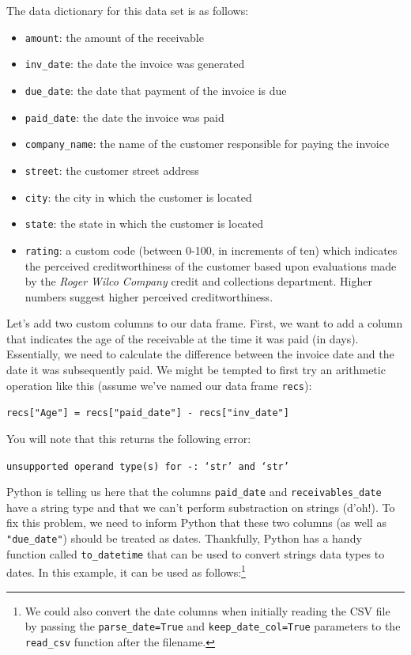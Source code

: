 \documentclass{book}
\begin{document}
The data dictionary for this data set is as follows:
\begin{itemize}
	\item \texttt{amount}: the amount of the receivable
	\item \texttt{inv\_date}: the date the invoice was generated
	\item \texttt{due\_date}: the date that payment of the invoice is due
	\item \texttt{paid\_date}: the date the invoice was paid
	\item \texttt{company\_name}: the name of the customer responsible for paying the invoice
	\item \texttt{street}: the customer street address
	\item \texttt{city}: the city in which the customer is located
	\item \texttt{state}: the state in which the customer is located
	\item \texttt{rating}: a custom code (between 0-100, in increments of ten) which indicates the perceived creditworthiness of the customer based upon evaluations made by the \textit{Roger Wilco Company} credit and collections department. Higher numbers suggest higher perceived creditworthiness.
\end{itemize}

Let's add two custom columns to our data frame. First, we want to add a column that indicates the age of the receivable at the time it was paid (in days). Essentially, we need to calculate the difference between the invoice date and the date it was subsequently paid. We might be tempted to first try an arithmetic operation like this (assume we've named our data frame \texttt{recs}):

\texttt{recs["Age"] = recs["paid\_date"] - recs["inv\_date"]}

You will note that this returns the following error:

\texttt{unsupported operand type(s) for -: `str' and `str'}

Python is telling us here that the columns \texttt{paid\_date} and \texttt{receivables\_date} have a string type and that we can't perform substraction on strings (d'oh!). To fix this problem, we need to inform Python that these two columns (as well as \texttt{"due\_date"}) should be treated as dates. Thankfully, Python has a handy function called \texttt{to\_datetime} that can be used to convert strings data types to dates. In this example, it can be used as follows:\footnote{We could also convert the date columns when initially reading the CSV file by passing the \texttt{parse\_date=True} and \texttt{keep\_date\_col=True} parameters to the \texttt{read\_csv} function after the filename.}
\end{document}

